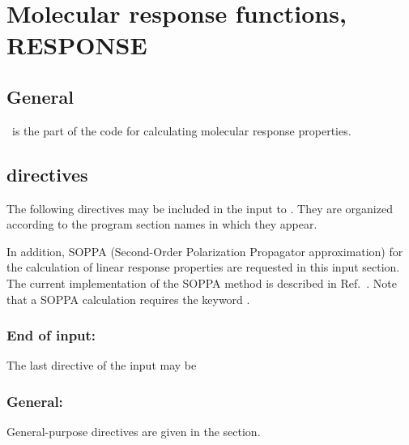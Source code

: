 \chapter{Molecular response functions, RESPONSE}
\label{ch:response}

\section{General}

\resp\ is the part of the code for calculating molecular
response properties.

\section{ directives}\label{sec:rspinp}

The following directives may be included in the input to \resp.
They are organized according to the program section names in which they
appear.

In addition, SOPPA
(Second-Order Polarization Propagator 
approximation) for the calculation of linear response
properties are requested in this input section. The current
implementation of the SOPPA method is described 
in Ref.~\cite{mjpekdtehjajjojcp}. Note that a SOPPA calculation
requires the keyword .


\subsection{End of input: }

The last directive of the  input may be 

\subsection{General: }

General-purpose directives are given in the  section.

